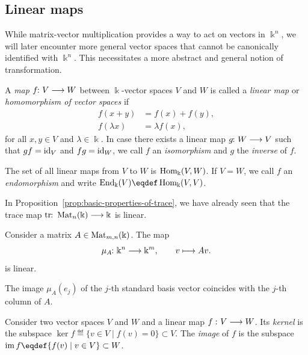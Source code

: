 \documentclass[a4paper, oneside, 12pt]{amsart}
\begin{document}
\subsection{Linear maps}\label{sec:linear-maps}

While matrix-vector multiplication provides a way to act on vectors in \( \Bbbk^n \), we will later encounter more general vector spaces that cannot be canonically identified with \( \Bbbk^{n}\).
This necessitates a more abstract and general notion of transformation.

\begin{definition}\label{def:linear-maps}
  A \emph{map} \( f \from V \to W \) between \(\Bbbk\)-vector spaces \(V\) and \(W\) is called  a \emph{linear map} or \emph{homomorphism of vector spaces} if
  \begin{subequations}
    \begin{align}
      f(x + y) &= f(x) + f(y), \\
      f(\lambda x) &= \lambda f(x),
    \end{align}
  \end{subequations}
  for all \( x, y \in V \) and \( \lambda \in \Bbbk \).
  In case there exists a linear map \(g \from W \to V\) such that \(g f = \mathrm{id}_{V} \) and \(f g = \mathrm{id}_{W}\), we call \(f\) an \emph{isomorphism} and \(g\) the \emph{inverse} of \(f\).

  The set of all linear maps from \( V \) to \( W \) is \(\operatorname{Hom}_{ \Bbbk}(V, W) \).
  If \(V=W\), we call \(f\) an \emph{endomorphism} and write \(\End_{ \Bbbk}(V) \eqdef \Hom_{ \Bbbk}(V,V)\).
\end{definition}

In Proposition~\ref{prop:basic-properties-of-trace}, we have already seen that the trace map \(\tr \from \Mat_{n}( \Bbbk) \to \Bbbk\) is linear.

\begin{example}\label{ex:matrices-lead-to-linear-multiplication}
  Consider a matrix \(A\in \operatorname{Mat}_{m,n}( \Bbbk)\).
  The map
  \begin{equation}
    \mu_{A} \from \Bbbk^{n}\to \Bbbk^{m}, \qquad v \mapsto Av.
  \end{equation}
  is linear.

  The image \(\mu_{A}(e_{j})\) of the \(j\)-th standard basis vector coincides with the \(j\)-th column of \(A\).
\end{example}

\begin{definition}\label{def:image-and-kernel}
  Consider two vector spaces \(V\) and \(W\) and a linear map \(f\ \from V \to W\).
  Its \emph{kernel} is the subspace \(\ker f \eqdef \{v \in V \mid f(v) = 0\} \subset V\).
  The \emph{image} of \(f\) is the subspace \(\im f \eqdef \{f(v) \mid v\in V\} \subset W\).
\end{definition}
\end{document}
